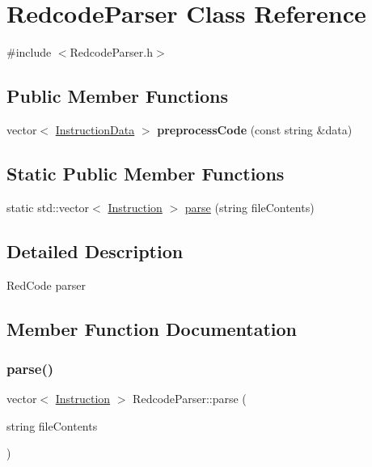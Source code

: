 \hypertarget{classRedcodeParser}{}\section{Redcode\+Parser Class Reference}
\label{classRedcodeParser}


{\ttfamily \#include $<$Redcode\+Parser.\+h$>$}

\subsection*{Public Member Functions}
\begin{DoxyCompactItemize}
\item 
\mbox{\label{classRedcodeParser_aabf3254b48f1d8c3f0df1f0d3355f774}} 
vector$<$ \hyperlink{classInstructionData}{Instruction\+Data} $>$ {\bfseries preprocess\+Code} (const string \&data)
\end{DoxyCompactItemize}
\subsection*{Static Public Member Functions}
\begin{DoxyCompactItemize}
\item 
static std\+::vector$<$ \hyperlink{classInstruction}{Instruction} $>$ \hyperlink{classRedcodeParser_a405383d668d3045068f4e10141cfb1fa}{parse} (string file\+Contents)
\end{DoxyCompactItemize}


\subsection{Detailed Description}
Red\+Code parser 

\subsection{Member Function Documentation}
\mbox{\label{classRedcodeParser_a405383d668d3045068f4e10141cfb1fa}} 
\subsubsection{\texorpdfstring{parse()}{parse()}}
{\footnotesize\ttfamily vector$<$ \hyperlink{classInstruction}{Instruction} $>$ Redcode\+Parser\+::parse (\begin{DoxyParamCaption}\item[{string}]{file\+Contents }\end{DoxyParamCaption})\hspace{0.3cm}{\ttfamily [static]}}

